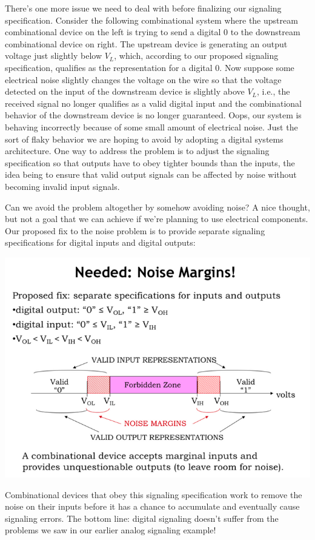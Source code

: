 \documentclass[a4paper,twoside]{article}
\numberwithin{equation}{section}
\begin{document}
There's one more issue we need to deal with before finalizing our signaling specification.
Consider the following combinational system where the upstream combinational device on the left is
trying to send a digital 0 to the downstream combinational device on right. The upstream device is
generating an output voltage just slightly below $V_L$, which, according to our proposed signaling
specification, qualifies as the representation for a digital 0.
Now suppose some electrical noise slightly changes the voltage on the wire so that the voltage detected
on the input of the downstream device is slightly above $V_L$, i.e., the received signal no longer
qualifies as a valid digital input and the combinational behavior of the downstream device is no longer
guaranteed.
Oops, our system is behaving incorrectly because of some small amount of electrical noise. Just the
sort of flaky behavior we are hoping to avoid by adopting a digital systems architecture.
One way to address the problem is to adjust the signaling specification so that outputs have to obey
tighter bounds than the inputs, the idea being to ensure that valid output signals can be affected by
noise without becoming invalid input signals.

Can we avoid the problem altogether by somehow avoiding noise? A nice thought, but not a goal that we
can achieve if we're planning to use electrical components. Our proposed fix to the noise problem is to
provide separate signaling specifications for digital inputs and digital outputs:
\begin{center}
    \includegraphics[scale = 0.3]{assets/noise_margins.png}
\end{center}
Combinational devices that obey this signaling specification work to remove the noise on their inputs
before it has a chance to accumulate and eventually cause signaling errors. The bottom line: digital signaling doesn't suffer from the problems we saw in our earlier analog signaling example!
\end{document}
